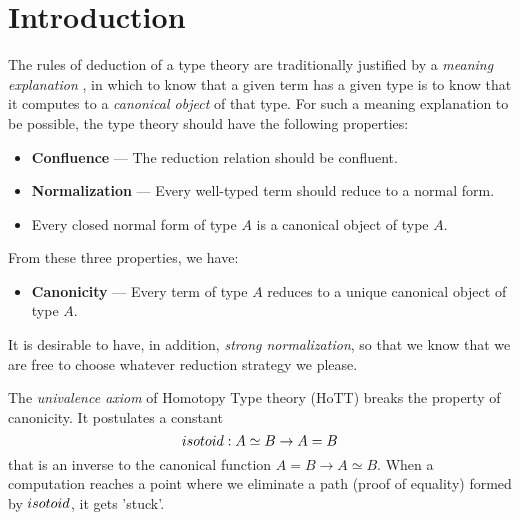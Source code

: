 \usepackage{amsmath}
\usepackage{amssymb}
\usepackage{autofe}
\usepackage{bbm}
\usepackage[greek,english]{babel}
\usepackage{etex}
\usepackage{framed}
\usepackage[utf8x]{inputenc}
\usepackage{proof}
\usepackage{stmaryrd}
\usepackage{suffix}
\usepackage{textalpha}
\usepackage{todo}
\usepackage{ucs}



\newcommand{\AgdaHide}[1]{}



\maketitle

\section{Introduction}

The rules of deduction of a type theory are traditionally justified by a \emph{meaning explanation} \cite{ML:ITT}, in which to know that a given term has a given type is to know that it computes to a \emph{canonical object} of that type.  For such a meaning explanation to be possible, the type theory should have the following properties:
\begin{itemize}
\item \textbf{Confluence} --- The reduction relation should be confluent.
\item \textbf{Normalization} --- Every well-typed term should reduce to a normal form.
\item Every closed normal form of type $A$ is a canonical object of type $A$.
\end{itemize}
From these three properties, we have:
\begin{itemize}
\item \textbf{Canonicity} --- Every term of type $A$ reduces to a unique canonical object of type $A$.
\end{itemize}

It is desirable to have, in addition, \emph{strong normalization}, so that we know that we are free to choose whatever reduction strategy we please.

The \emph{univalence axiom} of Homotopy Type theory (HoTT) \cite{hottbook} breaks the property of canonicity.  It postulates a
constant
\[ isotoid : A \simeq B \rightarrow A = B \]
that is an inverse to the canonical function $A = B \rightarrow A \simeq B$.  When a computation reaches a point
where we eliminate a path (proof of equality) formed by $isotoid$, it gets 'stuck'.

